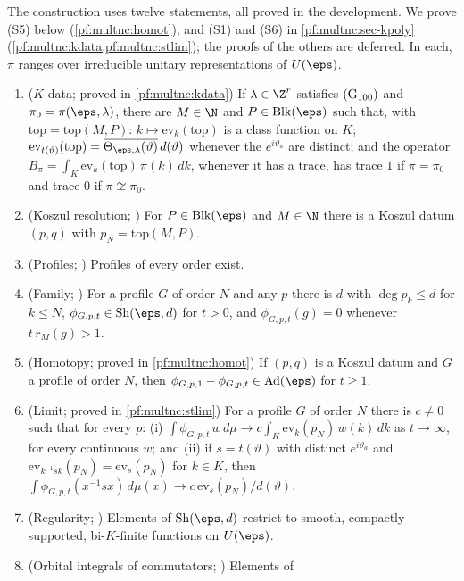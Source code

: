 The construction uses twelve statements, all proved in the development. We prove (S5) below
(\cref{pf:multnc:homot}), and (S1) and (S6) in \cref{pf:multnc:sec-kpoly} (\cref{pf:multnc:kdata,pf:multnc:stlim}); the
proofs of the others are deferred. In each, $\pi$ ranges over irreducible unitary representations of $U(\eps)$.
\begin{enumerate}[label=(S\arabic*)]
\item ($K$-data; proved in \cref{pf:multnc:kdata}) If $\lambda\in\Z^r$ satisfies
$\textup{(G$_{100}$)}$ and $\pi_0=\pi(\eps,\lambda)$, there are $M\in\N$ and $P\in\mathrm{Blk}(\eps)$ such that, with
$\mathrm{top}=\mathrm{top}(M,P)$: $k\mapsto\mathrm{ev}_k(\mathrm{top})$ is a class function on $K$;
$\mathrm{ev}_{t(\vartheta)}(\mathrm{top})=\overline{\Theta_{\eps,\lambda}(\vartheta)}\,d(\vartheta)$ whenever the
$e^{i\vartheta_a}$ are distinct; and the operator $B_\pi=\int_K\mathrm{ev}_k(\mathrm{top})\,\pi(k)\,dk$, whenever it has a
trace, has trace $1$ if $\pi=\pi_0$ and trace $0$ if $\pi\not\cong\pi_0$.
\item (Koszul resolution; ) For $P\in\mathrm{Blk}(\eps)$ and $M\in\N$ there is a
Koszul datum $(p,q)$ with $p_N=\mathrm{top}(M,P)$.
\item (Profiles; ) Profiles of every order exist.
\item (Family; ) For a profile $G$ of order $N$ and any $p$ there is $d$ with
$\deg p_k\le d$ for $k\le N$, $\phi_{G,p,t}\in\mathrm{Sh}(\eps,d)$ for $t>0$, and $\phi_{G,p,t}(g)=0$ whenever
$t\,r_M(g)>1$.
\item (Homotopy; proved in \cref{pf:multnc:homot}) If $(p,q)$ is a Koszul datum and $G$ a profile of order $N$, then
$\phi_{G,p,1}-\phi_{G,p,t}\in\mathrm{Ad}(\eps)$ for $t\ge1$.
\item (Limit; proved in \cref{pf:multnc:stlim}) For a profile $G$ of order $N$ there is $c\ne0$ such that for every
$p$: (i) $\int\phi_{G,p,t}\,w\,d\mu\to c\int_K\mathrm{ev}_k(p_N)\,w(k)\,dk$ as $t\to\infty$, for every continuous $w$; and
(ii) if $s=t(\vartheta)$ with distinct $e^{i\vartheta_a}$ and $\mathrm{ev}_{k^{-1}sk}(p_N)=\mathrm{ev}_s(p_N)$ for $k\in K$,
then $\int\phi_{G,p,t}(x^{-1}sx)\,d\mu(x)\to c\,\mathrm{ev}_s(p_N)/d(\vartheta)$.
\item (Regularity; ) Elements of $\mathrm{Sh}(\eps,d)$ restrict to smooth,
compactly supported, bi-$K$-finite functions on $U(\eps)$.
\item (Orbital integrals of commutators; ) Elements of

\end{enumerate}
